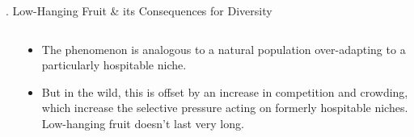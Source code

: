 \documentclass[9pt]{beamer}
\newcommand{\BackgroundImage}[2][0.3] {
  \tikz[remember picture,overlay]
  \node[opacity=#1+0.1, inner sep=0pt] at (current page.center)
       {\texttt{[image: \#2]}};
       \clearpage
}
\begin{document}
\begin{frame}{\theframenumber. Low-Hanging Fruit \& its Consequences for Diversity}
\begin{columns}
\begin{column}{.5\textwidth}
\begin{itemize}
      \end{itemize}
    \end{column}
    \begin{column}{.5\textwidth}
      \begin{itemize}
      \item<+-> The phenomenon is analogous to a natural population
        over-adapting to a particularly hospitable niche.
      \item<+-> But in the wild, this is
        offset by an increase in competition and crowding,
        which increase the selective pressure acting on formerly
        hospitable niches. Low-hanging fruit doesn't last very long.
      \end{itemize}
    \end{column}
    \end{columns}
\end{frame}



\end{document}
